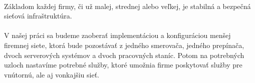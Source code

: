 \paragraph{}
Základom každej firmy, či už malej, strednej alebo veľkej, je stabilná a bezpečná sieťová infraštruktúra.
\paragraph{}
V našej práci sa budeme zaoberať implementáciou a konfiguráciou menšej firemnej siete, ktorá bude pozostávať z jedného smerovača, jedného prepínača, dvoch serverových systémov a dvoch pracovných staníc. Potom na potrebných uzloch nastavíme potrebné služby, ktoré umožnia firme poskytovať služby pre vnútornú, ale aj vonkajšiu sieť.
